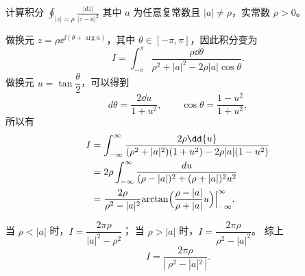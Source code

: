 \begin{question}
计算积分 \(\displaystyle \oint_{|z|=\rho} \frac{|dz|}{|z-a|^2}\) 其中 \(a\) 为任意复常数且 \(|a|\neq\rho\)，实常数 \(\rho>0\)。
\begin{solution}
做换元 \(z=\rho\ee^{\ii(\theta+\arg a)}\)，其中 \(\theta\in[-\pi,\pi]\)，因此积分变为
\[
I=\int_{-\pi}^{\pi}\frac{\rho\dd{}\theta}{\rho^2+|a|^2-2\rho|a|\cos\theta}.
\]
做换元 \(u=\tan\dfrac{\theta}{2}\)，可以得到
\[
d\theta=\frac{2\dd{u}}{1+u^2},\qquad \cos\theta=\frac{1-u^2}{1+u^2},
\]
所以有
\[
\begin{aligned}
I&=\int_{-\infty}^{\infty}\frac{2\rho\dd{u}}{(\rho^2+|a|^2)(1+u^2)-2\rho|a|(1-u^2)}\\
&=2\rho\int_{-\infty}^{\infty}\frac{du}{(\rho-|a|)^2+(\rho+|a|)^2u^2}\\
&=\frac{2\rho}{\rho^2-|a|^2}\Bigl.\arctan\Bigl(\frac{\rho-|a|}{\rho+|a|}u\Bigr)\Bigr|_{-\infty}^{\infty}.
\end{aligned}
\]

当 \(\rho<|a|\) 时，\(I=\dfrac{2\pi\rho}{|a|^2-\rho^2}\)；
当 \(\rho>|a|\) 时，\(I=\dfrac{2\pi\rho}{\rho^2-|a|^2}\)。
综上
\[
I=\frac{2\pi\rho}{|\,\rho^2-|a|^2\,|}.
\]
\end{solution}
\end{question}
